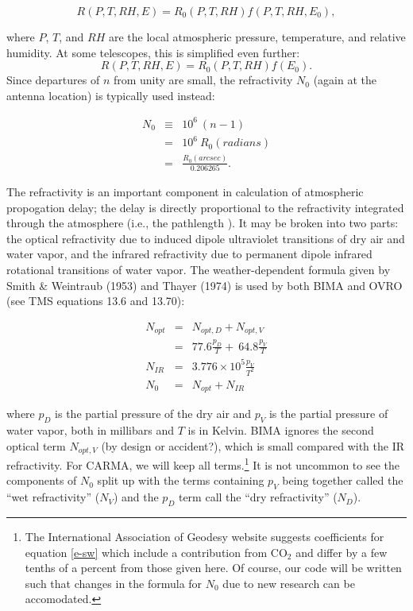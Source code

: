 \documentclass[preprint]{aastex}
\newcommand{\scrL}{ %
   \ifmmode{{\mathscr L}}
   \else{${\mathscr L}$\/}
   \fi}
\begin{document}
\begin{equation}
 R(P,T,RH,E) = R_0(P,T,RH) f(P,T,RH,E_0), 
\label{e-Rsep}
\end{equation}

\noindent where $P$, $T$, and $RH$ are the local atmospheric pressure,
temperature, and relative humidity.  At some telescopes, this is
simplified even further:
\begin{equation}
 R(P,T,RH,E) = R_0(P,T,RH) f(E_0).
\label{e-Rsepsimple}
\end{equation}
\noindent Since departures of $n$ from
unity are small, the refractivity $N_0$ 
(again at the antenna location) is typically used instead:

\begin{eqnarray}
N_0 &\equiv& 10^6~(n - 1)\\
  &=& 10^6~R_0 (radians)\\
  &=& \frac{R_0 (arcsec)}{0.206265}.
\label{e-Ndef}
\end{eqnarray}

\noindent The refractivity is an important component in calculation of
atmospheric propogation delay; the delay is directly proportional to the
refractivity integrated through the atmosphere (i.e., the pathlength \scrL). It may be broken into
two parts: the optical refractivity due to induced dipole ultraviolet
transitions of dry air and water vapor, and the infrared refractivity
due to permanent dipole infrared rotational transitions of water vapor.
The weather-dependent formula given by Smith \& Weintraub (1953) and Thayer
(1974) is used by both BIMA and OVRO (see TMS equations 13.6 and 13.70):

\begin{eqnarray}
N_{opt} &=& N_{opt,D} + N_{opt,V} \\
	&=& 77.6 \frac{p_D}{T} +~64.8 \frac{p_V}{T} \\
\label{e-dry}
N_{IR} &=& 3.776\times10^5 \frac{p_V}{T^2}\\
\label{e-wet}
N_0 &=& N_{opt} + N_{IR}
\label{e-sw}
\end{eqnarray}

\noindent where $p_D$ is the partial pressure of the dry air and $p_V$
is the partial pressure of water vapor, both in millibars and $T$ is
in Kelvin.  BIMA ignores the second optical term $N_{opt,V}$ (by
design or accident?), which is small compared with the IR refractivity.
For CARMA, we will keep all terms.\footnote{The International Association of Geodesy
website suggests coefficients for equation \ref{e-sw} which include
a contribution from CO$_2$ and differ by a few tenths of a percent from
those given here. Of course, our code will be written such that changes
in the formula for $N_0$ due to new research can be accomodated.}
It is not uncommon to see the components of $N_0$ split up with
the terms containing $p_V$ being together called the ``wet refractivity''
($N_V$) and the $p_D$ term call the ``dry refractivity'' ($N_D$).
\end{document}
